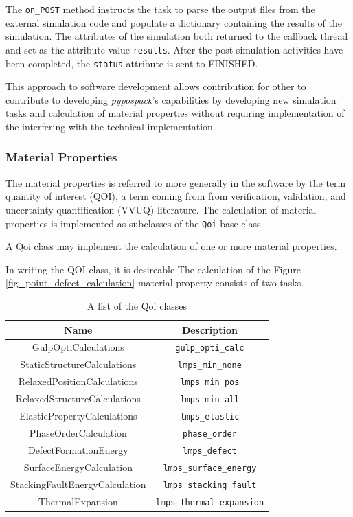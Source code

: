 The \verb|on_POST| method instructs the task to parse the output files from the external simulation code and populate a dictionary containing the results of the simulation.  The attributes of the simulation both returned to the callback thread and set as the attribute value \verb|results|.  After the post-simulation activities have been completed, the \verb|status| attribute is sent to FINISHED.

This approach to software development allows contribution for other to contribute to developing \emph{pypospack}'s capabilities by developing new simulation tasks and calculation of material properties without requiring implementation of the interfering with the technical implementation.

\subsubsection{Material Properties}

The material properties is referred to more generally in the software by the term quantity of interest (QOI), a term coming from  from verification, validation, and uncertainty quantification (VVUQ) literature.
The calculation of material properties is implemented as subclasses of the \verb|Qoi| base class.

A Qoi class may implement the calculation of one or more material properties.



In writing the QOI class, it is desireable
The calculation of the Figure \ref{fig_point_defect_calculation} material property consists of two tasks.

\begin{table}[ht]
	\centering
	\caption{A list of the Qoi classes}
	\begin{tabular}{cc}
		\hline
		Name
		  & Description \\
		\hline
    GulpOptiCalculations
		   & \verb|gulp_opti_calc| \\
		StaticStructureCalculations
		   & \verb|lmps_min_none| \\
		RelaxedPositionCalculations
		   & \verb|lmps_min_pos| \\
		RelaxedStructureCalculations
		   & \verb|lmps_min_all| \\
    ElasticPropertyCalculations
		   & \verb|lmps_elastic| \\
		PhaseOrderCalculation
		   & \verb|phase_order| \\
		DefectFormationEnergy
		   & \verb|lmps_defect| \\
		SurfaceEnergyCalculation
		   & \verb|lmps_surface_energy|  \\
		StackingFaultEnergyCalculation
			 & \verb|lmps_stacking_fault| \\
		ThermalExpansion
			 & \verb|lmps_thermal_expansion| \\
		\hline
	\end{tabular}
\end{table}

